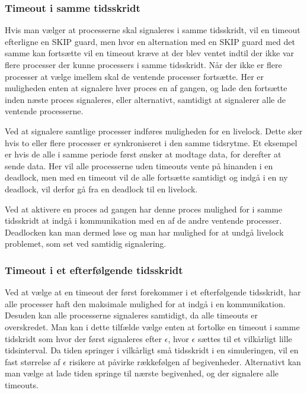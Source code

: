 \subsubsection{Timeout i samme tidsskridt} 

Hvis man vælger at processerne skal signaleres i samme tidsskridt, vil en timeout
efterligne en SKIP guard, men hvor en alternation med en SKIP guard med
det samme kan fortsætte vil en timeout kræve at der blev ventet indtil
der ikke var flere processer der kunne processers i samme tidsskridt.
Når der ikke er flere processer at vælge imellem skal de ventende
processer fortsætte. Her er muligheden enten at signalere hver proces
en af gangen, og lade den fortsætte inden næste proces signaleres,
eller alternativt, samtidigt at signalerer alle de ventende processerne.

Ved at signalere samtlige processer indføres muligheden for en
livelock. Dette sker hvis to eller flere processer er synkroniseret i
den samme tidsrytme. Et eksempel er hvis de alle i samme periode først
ønsker at modtage data, for derefter at sende data. Her vil alle
processerne uden timeouts vente på hinanden i en deadlock, men med en
timeout vil de alle fortsætte samtidigt og indgå i en ny deadlock,
\pycsp vil derfor gå fra en deadlock til en livelock. 

Ved at aktivere en proces ad gangen har denne proces mulighed for i
samme tidsskridt at indgå i kommunikation med en af de andre ventende
processer. Deadlocken kan man dermed løse og man har mulighed for at
undgå livelock problemet, som set ved samtidig signalering.


\subsubsection{Timeout i et efterfølgende tidsskridt} 
Ved at vælge at en timeout der først forekommer i et efterfølgende tidsskridt, har alle
processer haft den maksimale mulighed for at indgå i en kommunikation.
Desuden kan alle processerne signaleres samtidigt, da  alle timeouts
er overskredet. Man kan i dette tilfælde  vælge enten at fortolke en timeout i samme
tidskridt som hvor der først signaleres efter $\epsilon$, hvor $\epsilon$ sættes til
et vilkårligt lille tidsinterval. Da tiden springer i vilkårligt små
tidsskridt i en simuleringen, vil en fast størrelse af $\epsilon$
risikere at påvirke rækkefølgen af begivenheder. Alternativt kan man vælge
at lade tiden springe til nærste begivenhed, og der signalere alle timeouts.

